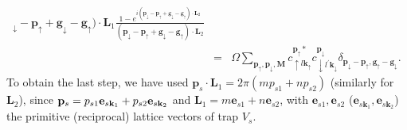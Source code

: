 \documentclass[twocolumn,english,prl,floatfix,citeautoscript,nofootinbib]{revtex4}
\begin{document}
\begin{widetext}
\begin{eqnarray}
{_{\downarrow }-\mathbf{p}_{\uparrow }+\mathbf{g}_{\downarrow }-\mathbf{g}%
_{\uparrow })\cdot \mathbf{L}_{1}}\frac{1-e^{i(\mathbf{p}_{\downarrow }-%
\mathbf{p}_{\uparrow }+\mathbf{g}_{\downarrow }-\mathbf{g}_{\uparrow })\cdot
\mathbf{L}_{2}}}{(\mathbf{p}_{\downarrow }-\mathbf{p}_{\uparrow }+\mathbf{g}%
_{\downarrow }-\mathbf{g}_{\uparrow })\cdot \mathbf{L}_{2}}  \label{eq:J} \\
&=&\Omega \sum_{\mathbf{p}_{\uparrow },\mathbf{p}_{\downarrow },\mathbf{M}%
}c_{\uparrow l\mathbf{k}_{\uparrow }}^{\mathbf{p}_{\uparrow }\ast
}c_{\downarrow l^{\prime }\mathbf{k}_{\downarrow }}^{\mathbf{p}_{\downarrow
}}\delta _{\mathbf{p}_{\downarrow }-\mathbf{p}_{\uparrow },\mathbf{g}%
_{\uparrow }-\mathbf{g}_{\downarrow }}.  \nonumber
\end{eqnarray}%
To obtain the last step, we have used $\mathbf{p}_{s}\cdot \mathbf{L}%
_{1}=2\pi (mp_{s1}+np_{s2})$ (similarly for $\mathbf{L}_{2}$), since $%
\mathbf{p}_{s}=p_{s1}\mathbf{e}_{s\mathbf{k}_{1}}+p_{s2}\mathbf{e}_{s\mathbf{%
k}_{2}}$ and $\mathbf{L}_{1}=m\mathbf{e}_{s1}+n\mathbf{e}_{s2}$, with $%
\mathbf{e}_{s1},\mathbf{e}_{s2}$ ($\mathbf{e}_{s\mathbf{k}_{1}},\mathbf{e}_{s%
\mathbf{k}_{2}}$) the primitive (reciprocal) lattice vectors of trap $V_{s}$.


\end{widetext}
\end{document}
